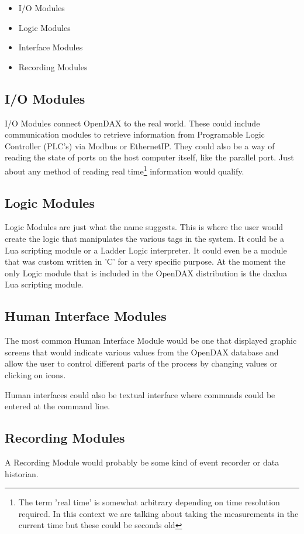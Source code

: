 \documentclass[10pt,letterpaper]{report}
\begin{document}
\begin{itemize}
\item I/O Modules
\item Logic Modules
\item Interface Modules
\item Recording Modules
\end{itemize}

\subsection*{I/O Modules}
I/O Modules connect OpenDAX to the real world. These could include communication modules to retrieve information from Programable Logic Controller (PLC's) via Modbus or EthernetIP.  They could also be a way of reading the state of ports on the host computer itself, like the parallel port.  Just about any method of reading real time\footnote{The term 'real time' is somewhat arbitrary depending on time resolution required.  In this context we are talking about taking the measurements in the current time but these could be seconds old} information would qualify.

\subsection*{Logic Modules}
Logic Modules are just what the name suggests.  This is where the user would create the logic that manipulates the various tags in the system.  It could be a Lua scripting module or a Ladder Logic interpreter.  It could even be a module that was custom written in 'C' for a very specific purpose.  At the moment the only Logic module that is included in the OpenDAX distribution is the daxlua Lua scripting module.

\subsection*{Human Interface Modules}
The most common Human Interface Module would be one that displayed graphic screens that would indicate various values from the OpenDAX database and allow the user to control different parts of the process by changing values or clicking on icons.

Human interfaces could also be textual interface where commands could be entered at the command line.

\subsection*{Recording Modules}
A Recording Module would probably be some kind of event recorder or data historian.
\end{document}
